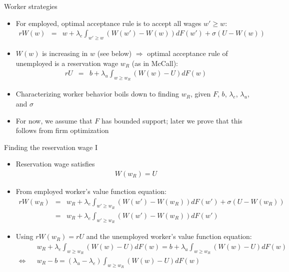 \documentclass[9pt]{beamer}
\newcommand{\bit}{\begin{itemize}}
\newcommand{\eit}{\end{itemize}}
\newcommand{\lb}{\label}
\begin{document}
\begin{frame}{Worker strategies}

\bit
\setlength\itemsep{2em}

\item For employed, optimal acceptance rule is to accept all wages $w' \geq w$:
\begin{eqnarray}
rW(w)  &=&  w + \lambda_e  \int_{w' \geq w} (W(w') - W(w)) dF(w') + \sigma(U-W(w)) \nonumber
\end{eqnarray}

\item $W(w)$ is increasing in $w$ (see below) $\Rightarrow$ optimal acceptance rule of unemployed is a reservation wage $w_R$ (as in McCall):
\begin{eqnarray}
rU  &=&  b + \lambda_u  \int_{w\geq w_R} (W(w)-U) dF(w) \nonumber
\end{eqnarray}

\item Characterizing worker behavior boils down to finding $w_R$, given $F$, $b$, $\lambda_e$, $\lambda_u$, and $\sigma$

\item For now, we assume that $F$ has bounded support; later we prove that this follows from firm optimization

\eit

\end{frame}


\begin{frame}{Finding the reservation wage I}

\bit
\setlength\itemsep{1.5em}

\item Reservation wage satisfies
\begin{eqnarray}
W(w_R) = U \nonumber
\end{eqnarray}

\item From employed worker's value function equation:
\begin{eqnarray}
rW(w_{R})  &=&  w_R + \lambda_e  \int_{w'\geq w_R} \left(W(w')-W(w_R)\right) dF(w') + \sigma(U-W(w_R)) \nonumber \\
&=&  w_R + \lambda_e  \int_{w'\geq w_R} \left(W(w')-W(w_R)\right) dF(w')\nonumber
\end{eqnarray}

\item Using $rW(w_R) = rU$ and the unemployed worker's value function equation:
\begin{eqnarray}
&& w_R + \lambda_e  \int_{w \geq w_R} (W(w) - U) dF(w) = b + \lambda_u  \int_{w \geq w_R} (W(w)-U) dF(w)   \nonumber \\
\lb{reservation_wage}
\Leftrightarrow && w_R-b = (\lambda_u-\lambda_e) \int_{w \geq w_R} (W(w)-U) dF(w) \nonumber  
\end{eqnarray}


\eit

\end{frame}
\end{document}

